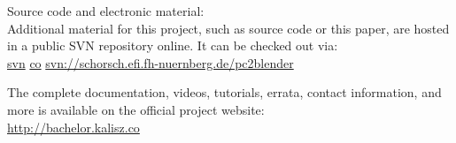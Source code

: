 \pagebreak
{}

\vspace{1.0 cm}


\huge
Source code and electronic material:\\

\normalsize
Additional material for this project, such as source code or this paper, are hosted in a public SVN repository online. It can be checked out via:\\

\url{svn} \url{co} \url{svn://schorsch.efi.fh-nuernberg.de/pc2blender}

\vspace{1.0 cm}

The complete documentation, videos, tutorials, errata, contact information, and more is available on the official project website:\\

\url{http://bachelor.kalisz.co}



